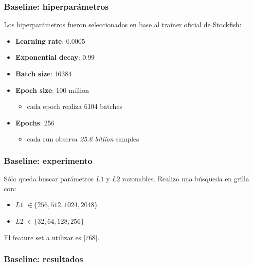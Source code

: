 \begin{frame}
\frametitle{Baseline: hiperparámetros}
Los hiperparámetros fueron seleccionados en base al trainer oficial de Stockfish:
\begin{itemize}
\item \textbf{Learning rate}: 0.0005
\item \textbf{Exponential decay}: 0.99
\item \textbf{Batch size}: 16384
\item \textbf{Epoch size}: 100 million
\begin{itemize}
    \item cada epoch realiza 6104 batches
\end{itemize}
\item \textbf{Epochs}: 256
\begin{itemize}
    \item cada run observa \textit{25.6 billion} samples
\end{itemize}
\end{itemize}
\end{frame}


\begin{frame}
\frametitle{Baseline: experimento}
Sólo queda buscar parámetros $L1$ y $L2$ razonables. Realizo una búsqueda en grilla con:
\begin{itemize}
\item $L1$ $\in \{256, 512, 1024, 2048\}$
\item $L2$ $\in \{32, 64, 128, 256\}$
\end{itemize}
El feature set a utilizar es [768].
\end{frame}

\begin{frame}
\frametitle{Baseline: resultados}
\begin{figure}
\centering
{}
\end{figure}
\end{frame}


